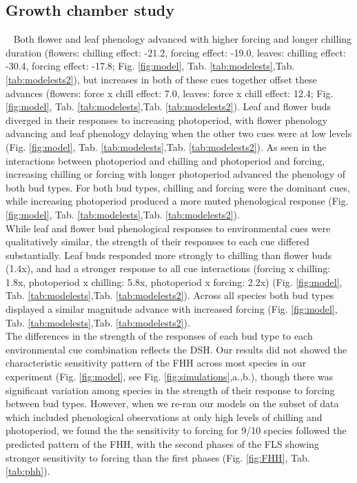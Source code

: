 \documentclass[11pt]{article}\usepackage[]{graphicx}\usepackage[]{color}
\begin{document}
\subsection*{Growth chamber study} \
\noindent  Both flower and leaf phenology advanced with higher forcing and longer chilling duration (flowers: chilling effect: -21.2, forcing effect: -19.0, leaves: chilling effect: -30.4, forcing effect: -17.8; Fig. \ref{fig:model}, Tab. \ref{tab:modelests},Tab. \ref{tab:modelests2}), but increases in both of these cues together offset these advances (flowers: force x chill effect: 7.0, leaves: force x chill effect: 12.4; Fig. \ref{fig:model}, Tab. \ref{tab:modelests},Tab. \ref{tab:modelests2}). Leaf and flower buds diverged in their responses to increasing photoperiod, with flower phenology advancing and leaf phenology  delaying when the other two cues were at low levels (Fig. \ref{fig:model}, Tab. \ref{tab:modelests},Tab. \ref{tab:modelests2}). As seen in the interactions between photoperiod and chilling and photoperiod and forcing, increasing chilling or forcing with longer photoperiod advanced the phenology of both bud types. For both bud types, chilling and forcing were the dominant cues, while increasing photoperiod produced a more muted phenological response (Fig. \ref{fig:model}, Tab. \ref{tab:modelests},Tab. \ref{tab:modelests2}). \\

\noindent While leaf and flower bud phenological responses to environmental cues were qualitatively similar, the strength of their responses to each cue differed substantially. Leaf buds responded more strongly to chilling than flower buds (1.4x), and had a stronger response to all cue interactions (forcing x chilling: 1.8x, photoperiod x chilling: 5.8x, photoperiod x forcing: 2.2x) (Fig. \ref{fig:model}, Tab. \ref{tab:modelests},Tab. \ref{tab:modelests2}). Across all species both bud types displayed a similar magnitude advance with increased forcing (Fig. \ref{fig:model}, Tab. \ref{tab:modelests},Tab. \ref{tab:modelests2}).\\

\noindent  The differences in the strength of the responses of each bud type to each environmental cue combination reflects the DSH. Our results did not showed the characteristic sensitivity pattern of the FHH across most species in our experiment (Fig. \ref{fig:model}, see Fig. \ref{fig:simulations},a.,b.), though there was significant variation among species in the strength of their response to forcing between bud types. However, when we re-ran our models on the subset of data which included phenological observations at only high levels of chilling and photoperiod, we found the the sensitivity to forcing for 9/10 species followed the predicted pattern of the FHH, with the second phases of the FLS showing stronger sensitivity to forcing than the first phases (Fig. \ref{fig:FHH}, Tab. \ref{tab:phh}).\\ 
\end{document}
